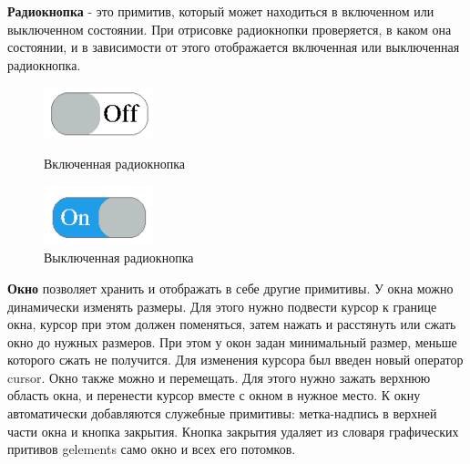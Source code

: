 \documentclass[14pt]{extarticle}
\begin{document}
		
		\textbf{Радиокнопка} - это примитив, который может находиться в включенном или выключенном состоянии. При отрисовке радиокнопки проверяется, в каком она состоянии, и в зависимости от этого отображается включенная или выключенная радиокнопка.
		\begin{figure}[h]
		\begin{center}
		\begin{minipage}[h]{0.4\linewidth}
		\includegraphics[width=90pt]{pictures/toggleButton1.png}
		\caption{ Включенная радиокнопка} %
		\label{ris:b1} %
		\end{minipage}
		\hfill 
		\begin{minipage}[h]{0.4\linewidth}
		\includegraphics[width=90pt]{pictures/toggleButton2.png}
		\caption{Выключенная радиокнопка}
		\label{ris:b2}
		\end{minipage}
		\end{center}
		\end{figure}
		
		\pagebreak
	\textbf{Окно} позволяет хранить и отображать в себе другие примитивы. У окна можно динамически изменять размеры. Для этого нужно подвести курсор к границе окна, курсор при этом должен поменяться, затем нажать и расстянуть или сжать окно до нужных размеров. При этом у окон задан минимальный размер, меньше которого сжать не получится. Для изменения курсора был введен новый оператор cursor. Окно также можно и перемещать. Для этого нужно зажать верхнюю область окна, и перенести курсор вместе с окном в нужное место. К окну автоматически добавляются служебные примитивы: метка-надпись в верхней части окна и кнопка закрытия. Кнопка закрытия удаляет из словаря графических притивов gelements само окно и всех его потомков.
			
\end{document}
